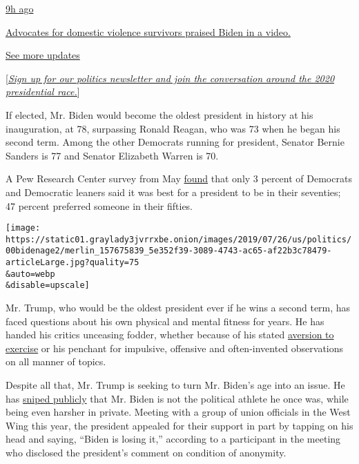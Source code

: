 \href{https://www.nytimes3xbfgragh.onion/live/2020/08/19/us/dnc-convention-election?action=click\&pgtype=Article\&state=default\&region=MAIN_CONTENT_1\&context=storylines_live_updates\#advocates-for-domestic-violence-survivors-praised-biden-in-a-video}{9h
ago}

\href{https://www.nytimes3xbfgragh.onion/live/2020/08/19/us/dnc-convention-election?action=click\&pgtype=Article\&state=default\&region=MAIN_CONTENT_1\&context=storylines_live_updates\#advocates-for-domestic-violence-survivors-praised-biden-in-a-video}{Advocates
for domestic violence survivors praised Biden in a video.}

\href{https://www.nytimes3xbfgragh.onion/live/2020/08/19/us/dnc-convention-election?action=click\&pgtype=Article\&state=default\&region=MAIN_CONTENT_1\&context=storylines_live_updates}{See
more updates}

{[}\href{https://www.nytimes3xbfgragh.onion/newsletters/politics?smid=rd?action=click\&module=Intentional\&pgtype=Article}{\emph{Sign
up for our politics newsletter and join the conversation around the 2020
presidential race.}}{]}

If elected, Mr. Biden would become the oldest president in history at
his inauguration, at 78, surpassing Ronald Reagan, who was 73 when he
began his second term. Among the other Democrats running for president,
Senator Bernie Sanders is 77 and Senator Elizabeth Warren is 70.

A Pew Research Center survey from May
\href{https://www.people-press.org/2019/05/23/nearly-half-of-democrats-say-the-best-age-for-a-president-is-in-their-50s/}{found}
that only 3 percent of Democrats and Democratic leaners said it was best
for a president to be in their seventies; 47 percent preferred someone
in their fifties.

\texttt{[image: https://static01.graylady3jvrrxbe.onion/images/2019/07/26/us/politics/00bidenage2/merlin\_157675839\_5e352f39-3089-4743-ac65-af22b3c78479-articleLarge.jpg?quality=75\\\&auto=webp\\\&disable=upscale]}

Mr. Trump, who would be the oldest president ever if he wins a second
term, has faced questions about his own physical and mental fitness for
years. He has handed his critics unceasing fodder, whether because of
his stated
\href{https://www.nytimes3xbfgragh.onion/2019/02/14/us/politics/trump-obese.html}{aversion
to exercise} or his penchant for impulsive, offensive and often-invented
observations on all manner of topics.

Despite all that, Mr. Trump is seeking to turn Mr. Biden's age into an
issue. He has
\href{https://www.nytimes3xbfgragh.onion/2019/06/11/us/politics/iowa-trump-biden.html}{sniped
publicly} that Mr. Biden is not the political athlete he once was, while
being even harsher in private. Meeting with a group of union officials
in the West Wing this year, the president appealed for their support in
part by tapping on his head and saying, ``Biden is losing it,''
according to a participant in the meeting who disclosed the president's
comment on condition of anonymity.

